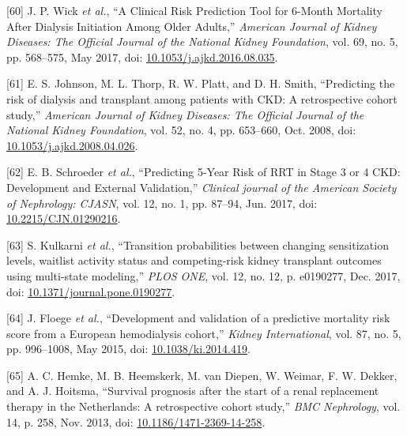 \documentclass[12pt,PhD,twoside,openright]{muthesis}
\newenvironment{cslreferences}%
  {}%
  {\par}
\begin{document}
\begin{cslreferences}
\leavevmode\hypertarget{ref-wick_clinical_2017}{}%
{[}60{]} J. P. Wick \emph{et al.}, ``A Clinical Risk Prediction Tool for 6-Month Mortality After Dialysis Initiation Among Older Adults,'' \emph{American Journal of Kidney Diseases: The Official Journal of the National Kidney Foundation}, vol. 69, no. 5, pp. 568--575, May 2017, doi: \href{https://doi.org/10.1053/j.ajkd.2016.08.035}{10.1053/j.ajkd.2016.08.035}.

\leavevmode\hypertarget{ref-johnson_predicting_2008}{}%
{[}61{]} E. S. Johnson, M. L. Thorp, R. W. Platt, and D. H. Smith, ``Predicting the risk of dialysis and transplant among patients with CKD: A retrospective cohort study,'' \emph{American Journal of Kidney Diseases: The Official Journal of the National Kidney Foundation}, vol. 52, no. 4, pp. 653--660, Oct. 2008, doi: \href{https://doi.org/10.1053/j.ajkd.2008.04.026}{10.1053/j.ajkd.2008.04.026}.

\leavevmode\hypertarget{ref-schroeder_predicting_2017}{}%
{[}62{]} E. B. Schroeder \emph{et al.}, ``Predicting 5-Year Risk of RRT in Stage 3 or 4 CKD: Development and External Validation,'' \emph{Clinical journal of the American Society of Nephrology: CJASN}, vol. 12, no. 1, pp. 87--94, Jun. 2017, doi: \href{https://doi.org/10.2215/CJN.01290216}{10.2215/CJN.01290216}.

\leavevmode\hypertarget{ref-kulkarni_transition_2017}{}%
{[}63{]} S. Kulkarni \emph{et al.}, ``Transition probabilities between changing sensitization levels, waitlist activity status and competing-risk kidney transplant outcomes using multi-state modeling,'' \emph{PLOS ONE}, vol. 12, no. 12, p. e0190277, Dec. 2017, doi: \href{https://doi.org/10.1371/journal.pone.0190277}{10.1371/journal.pone.0190277}.

\leavevmode\hypertarget{ref-floege_development_2015}{}%
{[}64{]} J. Floege \emph{et al.}, ``Development and validation of a predictive mortality risk score from a European hemodialysis cohort,'' \emph{Kidney International}, vol. 87, no. 5, pp. 996--1008, May 2015, doi: \href{https://doi.org/10.1038/ki.2014.419}{10.1038/ki.2014.419}.

\leavevmode\hypertarget{ref-hemke_survival_2013}{}%
{[}65{]} A. C. Hemke, M. B. Heemskerk, M. van Diepen, W. Weimar, F. W. Dekker, and A. J. Hoitsma, ``Survival prognosis after the start of a renal replacement therapy in the Netherlands: A retrospective cohort study,'' \emph{BMC Nephrology}, vol. 14, p. 258, Nov. 2013, doi: \href{https://doi.org/10.1186/1471-2369-14-258}{10.1186/1471-2369-14-258}.


\end{cslreferences}
\end{document}
